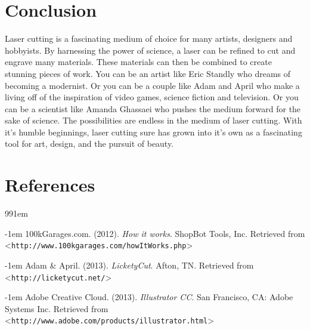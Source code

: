 \documentclass[12pt singlecol]{article}
\begin{document}
\begin{flushleft}
\section{Conclusion}

Laser cutting is a fascinating medium of choice for many artists, designers and hobbyists. By harnessing the power of science, a laser can be refined to cut and engrave many materials. These materials can then be combined to create stunning pieces of work. You can be an artist like Eric Standly who dreams of becoming a modernist. \cite{standley} Or you can be a couple like Adam and April who make a living off of the inspiration of video games, science fiction and television. \cite{licketycut13} Or you can be a scientist like Amanda Ghassaei who pushes the medium forward for the sake of science. \cite{ghassaei13} The possibilities are endless in the medium of laser cutting. With it's humble beginnings, laser cutting sure has grown into it's own as a fascinating tool for art, design, and the pursuit of beauty.

\newpage %
\renewcommand*{\refname}{} %
\onecolumn
\section{References}     %

\def\bibindent{1em}
\begin{thebibliography}{99\kern\bibindent}
\makeatletter
\let\old@biblabel\@biblabel
\def\@biblabel#1{\old@biblabel{#1}\kern\bibindent}
\let\old@bibitem\bibitem
\def\bibitem#1{\old@bibitem{#1}\leavevmode\kern-\bibindent}
\makeatother

	 100kGarages.com. (2012). \emph{How it works}. ShopBot Tools, Inc. Retrieved from \textless\texttt{http://www.100kgarages.com/howItWorks.php}\textgreater

	 Adam \& April. (2013). \emph{LicketyCut}. Afton, TN. Retrieved from \textless\texttt{http://licketycut.net/}\textgreater

	 Adobe Creative Cloud. (2013). \emph{Illustrator CC}. San Francisco, CA: Adobe Systems Inc. Retrieved from \textless\texttt{http://www.adobe.com/products/illustrator.html}\textgreater


\end{thebibliography}
\end{flushleft}
\end{document}
